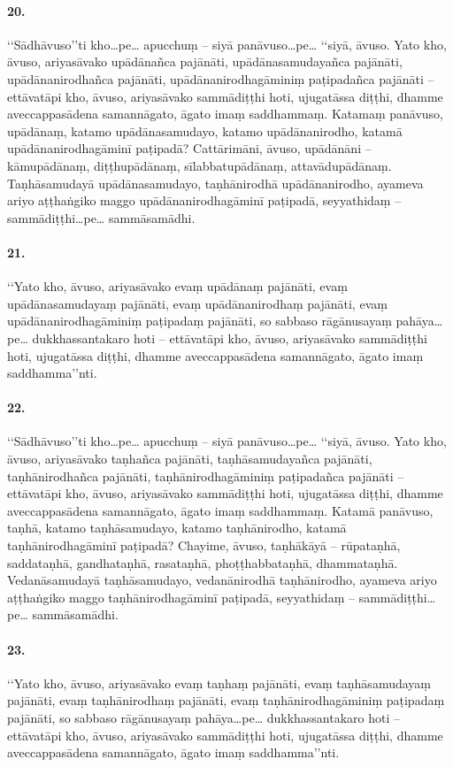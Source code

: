 \paragraph{20.} ‘‘Sādhāvuso’’ti kho…pe… apucchuṃ – siyā panāvuso…pe… ‘‘siyā, āvuso. Yato kho, āvuso, ariyasāvako upādānañca pajānāti, upādānasamudayañca pajānāti, upādānanirodhañca pajānāti, upādānanirodhagāminiṃ paṭipadañca pajānāti – ettāvatāpi kho, āvuso, ariyasāvako sammādiṭṭhi hoti, ujugatāssa diṭṭhi, dhamme aveccappasādena samannāgato, āgato imaṃ saddhammaṃ. Katamaṃ panāvuso, upādānaṃ, katamo upādānasamudayo, katamo upādānanirodho, katamā upādānanirodhagāminī paṭipadā? Cattārimāni, āvuso, upādānāni – kāmupādānaṃ, diṭṭhupādānaṃ, sīlabbatupādānaṃ, attavādupādānaṃ. Taṇhāsamudayā upādānasamudayo, taṇhānirodhā upādānanirodho, ayameva ariyo aṭṭhaṅgiko maggo upādānanirodhagāminī paṭipadā, seyyathidaṃ – sammādiṭṭhi…pe… sammāsamādhi.

\paragraph{21.} ‘‘Yato kho, āvuso, ariyasāvako evaṃ upādānaṃ pajānāti, evaṃ upādānasamudayaṃ pajānāti, evaṃ upādānanirodhaṃ pajānāti, evaṃ upādānanirodhagāminiṃ paṭipadaṃ pajānāti, so sabbaso rāgānusayaṃ pahāya…pe… dukkhassantakaro hoti – ettāvatāpi kho, āvuso, ariyasāvako sammādiṭṭhi hoti, ujugatāssa diṭṭhi, dhamme aveccappasādena samannāgato, āgato imaṃ saddhamma’’nti.

\paragraph{22.} ‘‘Sādhāvuso’’ti kho…pe… apucchuṃ – siyā panāvuso…pe… ‘‘siyā, āvuso. Yato kho, āvuso, ariyasāvako taṇhañca pajānāti, taṇhāsamudayañca pajānāti, taṇhānirodhañca pajānāti, taṇhānirodhagāminiṃ paṭipadañca pajānāti – ettāvatāpi kho, āvuso, ariyasāvako sammādiṭṭhi hoti, ujugatāssa diṭṭhi, dhamme aveccappasādena samannāgato, āgato imaṃ saddhammaṃ. Katamā panāvuso, taṇhā, katamo taṇhāsamudayo, katamo taṇhānirodho, katamā taṇhānirodhagāminī paṭipadā? Chayime, āvuso, taṇhākāyā – rūpataṇhā, saddataṇhā, gandhataṇhā, rasataṇhā, phoṭṭhabbataṇhā, dhammataṇhā. Vedanāsamudayā taṇhāsamudayo, vedanānirodhā taṇhānirodho, ayameva ariyo aṭṭhaṅgiko maggo taṇhānirodhagāminī paṭipadā, seyyathidaṃ – sammādiṭṭhi…pe… sammāsamādhi.

\paragraph{23.} ‘‘Yato kho, āvuso, ariyasāvako evaṃ taṇhaṃ pajānāti, evaṃ taṇhāsamudayaṃ pajānāti, evaṃ taṇhānirodhaṃ pajānāti, evaṃ taṇhānirodhagāminiṃ paṭipadaṃ pajānāti, so sabbaso rāgānusayaṃ pahāya…pe… dukkhassantakaro hoti – ettāvatāpi kho, āvuso, ariyasāvako sammādiṭṭhi hoti, ujugatāssa diṭṭhi, dhamme aveccappasādena samannāgato, āgato imaṃ saddhamma’’nti.

